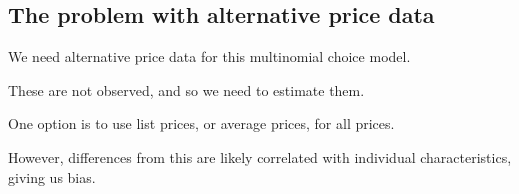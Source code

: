 
\subsection{The problem with alternative price data}

We need alternative price data for this multinomial choice model.

These are not observed, and so we need to estimate them.

One option is to use list prices, or average prices, for all prices.

However, differences from this are likely correlated with individual characteristics, giving us bias.

